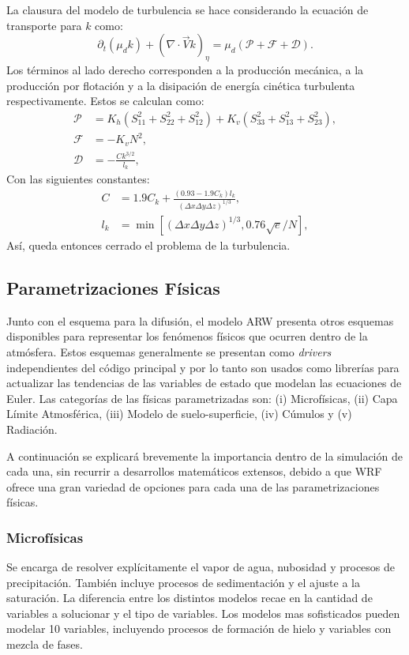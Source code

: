 La clausura del modelo de turbulencia se hace considerando la ecuación de transporte para $k$ como:
\begin{equation}
\partial_t(\mu_d k) + (\nabla\cdot\vec{V}k)_\eta = \mu_d(\mathcal{P} + \mathcal{F} + \mathcal{D}).
\end{equation}
Los términos al lado derecho corresponden a la producción mecánica, a la producción por flotación y a la disipación de energía cinética turbulenta respectivamente. Estos se calculan como:
\begin{align}
	\mathcal{P}&= K_h (S_{11}^2 + S_{22}^2 + S_{12}^2) + K_v (S_{33}^2 + S_{13}^2 + S_{23}^2),\\
	\mathcal{F}&=-K_v N^2,\\
	\mathcal{D}&=-\frac{C k^{3/2}}{l_k},
\end{align}
Con las siguientes constantes:
\begin{align}
	C &= 1.9C_k + \frac{(0.93 - 1.9 C_k)l_k}{(\Delta x \Delta y \Delta z)^{1/3}},\\
	l_k &= \min[(\Delta x \Delta y \Delta z)^{1/3}, 0.76\sqrt{e}/N],
\end{align}
Así, queda entonces cerrado el problema de la turbulencia.

\subsection{Parametrizaciones Físicas}
Junto con el esquema para la difusión, el modelo ARW presenta otros esquemas disponibles para representar los fenómenos físicos que ocurren dentro de la atmósfera. Estos esquemas generalmente se presentan como \emph{drivers} independientes del código principal y por lo tanto son usados como librerías para actualizar las tendencias de las variables de estado que modelan las ecuaciones de Euler. Las categorías de las físicas parametrizadas son: (i) Microfísicas, (ii) Capa Límite Atmosférica, (iii) Modelo de suelo-superficie, (iv) Cúmulos y (v) Radiación.

A continuación se explicará brevemente la importancia dentro de la simulación de cada una, sin recurrir a desarrollos matemáticos extensos, debido a que WRF ofrece una gran variedad de opciones para cada una de las  parametrizaciones físicas.
\subsubsection{Microfísicas}
Se encarga de resolver explícitamente el vapor de agua, nubosidad y procesos de precipitación. También incluye procesos de sedimentación y el ajuste a la saturación. La diferencia entre los distintos modelos recae en la cantidad de variables a solucionar y el tipo de variables. Los modelos mas sofisticados pueden modelar 10 variables, incluyendo procesos de formación de hielo y variables con mezcla de fases.
